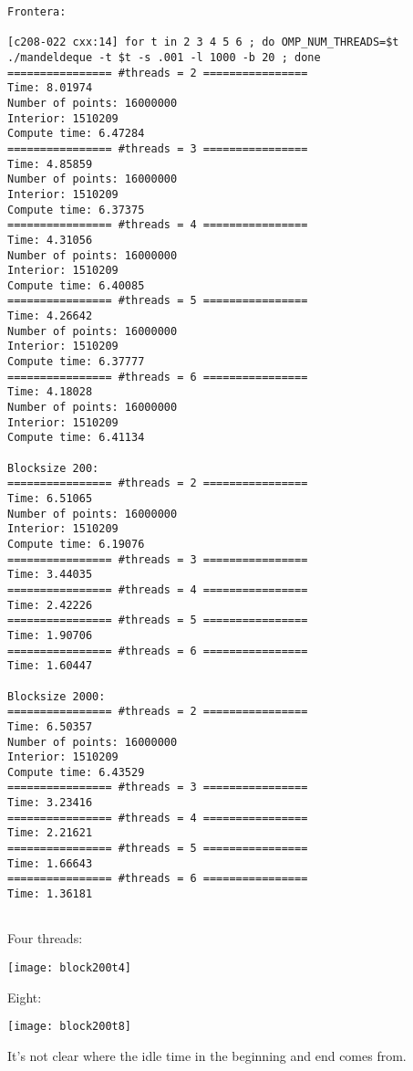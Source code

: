 \begin{verbatim}
Frontera:

[c208-022 cxx:14] for t in 2 3 4 5 6 ; do OMP_NUM_THREADS=$t ./mandeldeque -t $t -s .001 -l 1000 -b 20 ; done
================ #threads = 2 ================
Time: 8.01974
Number of points: 16000000
Interior: 1510209
Compute time: 6.47284
================ #threads = 3 ================
Time: 4.85859
Number of points: 16000000
Interior: 1510209
Compute time: 6.37375
================ #threads = 4 ================
Time: 4.31056
Number of points: 16000000
Interior: 1510209
Compute time: 6.40085
================ #threads = 5 ================
Time: 4.26642
Number of points: 16000000
Interior: 1510209
Compute time: 6.37777
================ #threads = 6 ================
Time: 4.18028
Number of points: 16000000
Interior: 1510209
Compute time: 6.41134

Blocksize 200:
================ #threads = 2 ================
Time: 6.51065
Number of points: 16000000
Interior: 1510209
Compute time: 6.19076
================ #threads = 3 ================
Time: 3.44035
================ #threads = 4 ================
Time: 2.42226
================ #threads = 5 ================
Time: 1.90706
================ #threads = 6 ================
Time: 1.60447

Blocksize 2000:
================ #threads = 2 ================
Time: 6.50357
Number of points: 16000000
Interior: 1510209
Compute time: 6.43529
================ #threads = 3 ================
Time: 3.23416
================ #threads = 4 ================
Time: 2.21621
================ #threads = 5 ================
Time: 1.66643
================ #threads = 6 ================
Time: 1.36181


\end{verbatim}

Four threads:

\texttt{[image: block200t4]}

Eight:

\texttt{[image: block200t8]}

It's not clear where the idle time in the beginning and end comes from.
